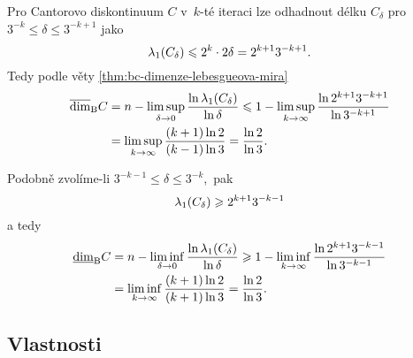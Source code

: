 \begin{example}
    Pro Cantorovo diskontinuum $C$ v~$k$-té iteraci lze odhadnout délku $C_\delta$ pro $3^{-k}\leqslant\delta\leqslant 3^{-k+1}$ jako
    \[\lambda_1(C_\delta)\leqslant2^k\cdot 2\delta=2^{k+1}3^{-k+1}.\]
    Tedy podle věty \ref{thm:bc-dimenze-lebesgueova-mira}
    \begin{align*}
        \overline{\dim}_\textup{B}{C}&=n-\limsup_{\delta\to 0}\dfrac{\ln{\ensuremath{\lambda_1}(C_\delta)}}{\ln{\delta}}\leqslant1-\limsup_{k\to\infty}\dfrac{\ln{2^{k+1}3^{-k+1}}}{\ln{3^{-k+1}}}\\
        &=\limsup_{k\to\infty}\dfrac{(k+1)\ln{2}}{(k-1)\ln{3}}=\dfrac{\ln{2}}{\ln{3}}.
    \end{align*}

    Podobně zvolíme-li $3^{-k-1}\leqslant\delta\leqslant 3^{-k}$,~pak
    \[\lambda_1(C_\delta)\geqslant 2^{k+1}3^{-k-1}\]
    a tedy
    \begin{align*}
        \underline{\dim}_\textup{B}{C}&=n-\liminf_{\delta\to 0}\dfrac{\ln{\ensuremath{\lambda_1}(C_\delta)}}{\ln{\delta}}\geqslant 1-\liminf_{k\to\infty}\dfrac{\ln{2^{k+1}3^{-k-1}}}{\ln{3^{-k-1}}}\\
        &=\liminf_{k\to\infty}\dfrac{(k+1)\ln{2}}{(k+1)\ln{3}}=\dfrac{\ln{2}}{\ln{3}}.
    \end{align*}
\end{example}

\subsection{Vlastnosti}\label{subsec:vlastnosti-bc-dimenze}

